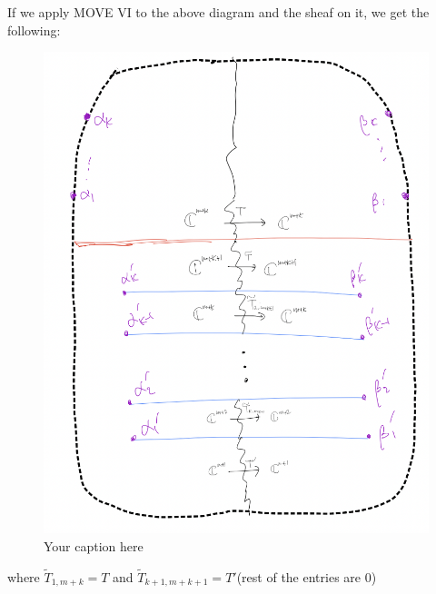 If we apply MOVE \RN{6} to the above diagram and the sheaf on it, we get the following:
\begin{figure}[H] %
    \centering
    \includegraphics[width=\linewidth]{diagrams/lemma6/2.png} %
    \caption{Your caption here}
    \label{fig:your-label}
\end{figure}
where $\tilde{T}_{1,m+k} = T$ and $\tilde{T}_{k+1,m+k+1} = T'$(rest of the entries are 0)

